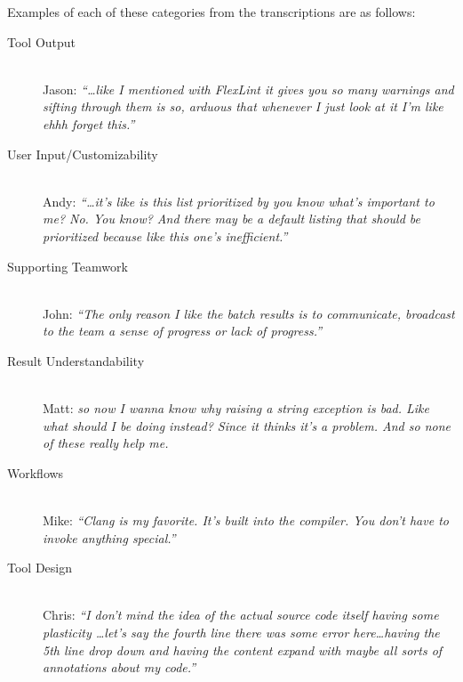 \noindent Examples of each of these categories from the transcriptions are as follows:
\begin{description}
\item[Tool Output] \hfill \\
    Jason: \emph{``\ldots like I mentioned with FlexLint it gives you so many warnings and sifting through them is so, arduous that whenever I just
look at it I'm like ehhh forget this.''}

\item[User Input/Customizability] \hfill \\ 
	Andy: \emph{``\ldots it's like is this
list prioritized by you know what's important to me? No. You know? And there
may be a default listing that should be prioritized because like this one's
inefficient.''}
\item[Supporting Teamwork] \hfill \\
	John: \emph{``The only reason I like the batch
results is to communicate, broadcast to the team a sense of progress or lack of
progress.''}
\item[Result Understandability] \hfill \\ 
	Matt: \emph{so now I wanna know why raising a string
exception is bad. Like what should I be doing instead? Since it thinks it's a
problem. And so none of these really help me.}
\item[Workflows] \hfill \\
	Mike: \emph{``Clang is my favorite. It's built into the compiler. You don't
have to invoke anything special.''}
\item[Tool Design] \hfill \\
	Chris: \emph{``I don't mind the idea of the actual source code itself having
some plasticity \ldots let's say the fourth line there was some error
here\ldots having the 5th line drop down and having the content expand with maybe all
sorts of annotations about my code.''}
\end{description}

